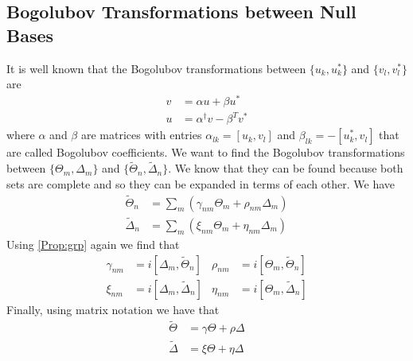 \documentclass[letterpaper]{article}
\newcommand{\DeltaT}{\ensuremath{\tilde{\Delta}}}
\newcommand{\ThetaT}{\ensuremath{\tilde{\Theta}}}
\begin{document}
 \subsection{Bogolubov Transformations between Null Bases}
It is well known that the Bogolubov transformations between
$\{u_k,u_k^*\}$ and $\{v_l,v_l^*\}$ are 
\begin{align}
  v&=\alpha u+\beta u^*\\
  u&=\alpha^{\dagger}v-\beta^Tv^*
\end{align}
where $\alpha$ and $\beta$ are matrices with entries
$\alpha_{lk}=[u_k,v_l]$ and
$\beta_{lk}=-[u_k^*,v_l]$ that are called Bogolubov
coefficients. We want to find the Bogolubov transformations between
$\{\Theta_m,\Delta_m\}$ and
$\{\tilde{\Theta}_n,\tilde{\Delta}_n\}$. We know
that they can be found because both sets are complete and so they can
be expanded in terms of each other. We have 
\begin{align}
  \ThetaT_n&=\sum_m(\gamma_{nm}\Theta_m+\rho_{nm}\Delta_m)\\
  \DeltaT_n&=\sum_m(\xi_{nm}\Theta_m+\eta_{nm}\Delta_m)
\end{align}
Using \eqref{Prop:grp} again we find that 
\begin{align}
  \gamma_{nm}&=i[\Delta_m,\ThetaT_n]&\rho_{nm}&=i[\Theta_m,\ThetaT_n]\\
  \xi_{nm}&=i[\Delta_m,\DeltaT_n]&\eta_{nm}&=i[\Theta_m,\DeltaT_n]
\end{align}
Finally, using matrix notation we have that 
\begin{align}
  \ThetaT&=\gamma\Theta+\rho\Delta\\
  \DeltaT&=\xi\Theta+\eta\Delta
\end{align}
\end{document}
